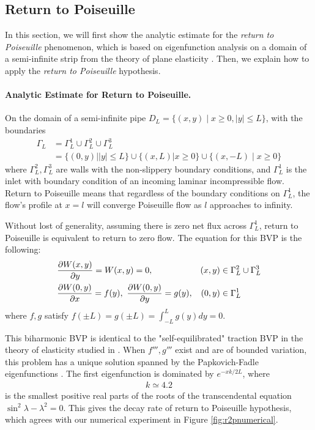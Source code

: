 \documentclass[10pt,twocolumn]{article}
\begin{document}
\subsection{Return to Poiseuille\label{sec:ret2poi}} 

In this section, we will first show the analytic estimate for the \textit{return to Poiseuille} phenomenon,
which is based on eigenfunction analysis on a domain of a semi-infinite strip from the theory of plane elasticity 
\cite{gregoryTractionBoundaryValue1980}. 
Then, we explain how to apply the \textit{return to Poiseuille} hypothesis. 

\paragraph*{Analytic Estimate for Return to Poiseuille. }

On the domain of a semi-infinite pipe $D_L = \{(x,y)\mid x \ge 0, |y| \le L\}$, with the boundaries 
\begin{align}
  \Gamma_L &= \Gamma_L^1 \cup \Gamma_L^2 \cup \Gamma_L^3 \\
  &=\{(0,y)||y| \le L \} \cup \{(x,L)|x\ge 0\} \cup \{(x,-L)\mid x\ge 0\}\nonumber
\end{align}
where $\Gamma_L^2,\Gamma_L^3$ are walls with the non-slippery boundary conditions, 
and $\Gamma_L^1$ is the inlet with boundary condition of an
incoming laminar incompressible flow. 
Return to Poiseuille means that regardless of the boundary conditions on $\Gamma_L^1$,
the flow's profile at $x = l$ will converge Poiseuille flow as $l$ approaches to infinity. 

Without lost of generality, assuming there is zero net flux across $\Gamma_L^1$,
return to Poiseuille is equivalent to return to zero flow. The equation for this BVP
is the following:
\begin{align}
  &\pdv{W(x,y)}{y}  = W(x,y) = 0,  &(x,y) &\in \Gamma_L^2 \cup \Gamma_L^3 \\
  &\pdv{W(0,y)}{x}  = f(y),\ \pdv{W(0,y)}{y} = g(y), &(0,y) &\in \Gamma_L^1  \label{eq:velocity-condition-at-inlet}
\end{align}
where $f,g$ satisfy $f(\pm L) = g(\pm L) = \int_{-L}^L g(y)dy = 0$. 

This biharmonic BVP is identical to the "self-equilibrated" traction BVP in the theory of elasticity studied in
\cite{gregoryTractionBoundaryValue1980,horganDECAYESTIMATESBIHARMONIC1989,coRecentDevelopmentsConcerning1983}. 
When $f''',g'''$ exist and are of bounded variation, 
this problem has a unique solution spanned by the Papkovich-Fadle eigenfunctions \cite{gregoryTractionBoundaryValue1980}.
The first eigenfunction is dominated by $e^{-xk/2L}$, where 
\begin{align*}
  k \simeq 4.2 
\end{align*}
is the smallest positive real parts of the roots 
of the transcendental equation $\sin^2\lambda - \lambda^2=0$. 
This gives the decay rate of return to Poiseuille hypothesis, 
which agrees with our numerical experiment in Figure \ref{fig:r2pnumerical}. 
\end{document}
